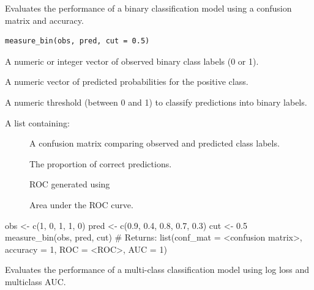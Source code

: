 \documentclass[a4paper]{book}
\begin{document}
%
\begin{Description}
Evaluates the performance of a binary classification model using a confusion matrix and accuracy.
\end{Description}
%
\begin{Usage}
\begin{verbatim}
measure_bin(obs, pred, cut = 0.5)
\end{verbatim}
\end{Usage}
%
\begin{Arguments}
\begin{ldescription}
\item[\code{obs}] A numeric or integer vector of observed binary class labels (0 or 1).

\item[\code{pred}] A numeric vector of predicted probabilities for the positive class.

\item[\code{cut}] A numeric threshold (between 0 and 1) to classify predictions into binary labels.
\end{ldescription}
\end{Arguments}
%
\begin{Value}
A list containing:
\begin{description}

\item[] A confusion matrix comparing observed and predicted class labels.
\item[] The proportion of correct predictions.
\item[] ROC generated using 
\item[] Area under the ROC curve.

\end{description}

\end{Value}
%
\begin{Examples}
\begin{ExampleCode}
obs <- c(1, 0, 1, 1, 0)
pred <- c(0.9, 0.4, 0.8, 0.7, 0.3)
cut <- 0.5
measure_bin(obs, pred, cut)
# Returns: list(conf_mat = <confusion matrix>, accuracy = 1, ROC = <ROC>, AUC = 1)

\end{ExampleCode}
\end{Examples}
%
\begin{Description}
Evaluates the performance of a multi-class classification model using log loss and multiclass AUC.
\end{Description}
\end{document}
